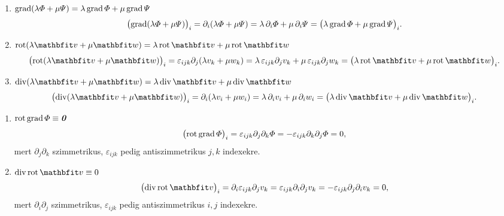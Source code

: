 \begin{example}
  \begin{enumerate}
    \item \underline{
            $\operatorname{grad}(\lambda\varPhi+\mu\varPsi)=\lambda\operatorname{grad}\varPhi+\mu\operatorname{grad}\varPsi$
          }
          $$
            \bigl(\operatorname{grad}(\lambda\varPhi+\mu\varPsi)\bigr)_i
            = \partial_i(\lambda\varPhi+\mu\varPsi)
            = \lambda\,\partial_i\varPhi+\mu\,\partial_i\varPsi
            = \bigl(\lambda\operatorname{grad}\varPhi+\mu\operatorname{grad}\varPsi\bigr)_i
            \text.
          $$

    \item \underline{
            $\rot(\lambda\rvec v+\mu\rvec w)=\lambda\rot\rvec v+\mu\rot\rvec w$
          }
          $$
            \bigl(\rot(\lambda\rvec v+\mu\rvec w)\bigr)_i
            = \varepsilon_{ijk}\partial_j(\lambda v_k+\mu w_k)
            = \lambda\,\varepsilon_{ijk}\partial_jv_k+\mu\,\varepsilon_{ijk}\partial_jw_k
            = \bigl(\lambda\rot\rvec v+\mu\rot\rvec w\bigr)_i
            \text.
          $$

    \item \underline{
            $\Div(\lambda\rvec v+\mu\rvec w)=\lambda\Div\rvec v+\mu\Div\rvec w$
          }
          $$
            \bigl(\Div(\lambda\rvec v+\mu\rvec w)\bigr)_i
            = \partial_i(\lambda v_i+\mu w_i)
            = \lambda\,\partial_iv_i+\mu\,\partial_iw_i
            = \bigl(\lambda\Div\rvec v+\mu\Div\rvec w\bigr)_i
            \text.
          $$
  \end{enumerate}
\end{example}

\begin{example}
  \begin{enumerate}
    \item \underline{$\operatorname{rot}\operatorname{grad}\varPhi\equiv\text{\textbf{\textit{0}}}$}
          $$
            \bigl(\operatorname{rot}\operatorname{grad}\varPhi\bigr)_i=\varepsilon_{ijk}\partial_j\partial_k\varPhi
            = -\varepsilon_{ijk}\partial_k\partial_j\varPhi=0,
          $$
          mert $\partial_j\partial_k$ szimmetrikus, $\varepsilon_{ijk}$ pedig
          antiszimmetrikus $j,k$ indexekre.

    \item \underline{$\Div\rot\rvec v\equiv0$}
          $$
            \bigl(\Div\rot\rvec v\bigr)_i=\partial_i\varepsilon_{ijk}\partial_jv_k
            = \varepsilon_{ijk}\partial_i\partial_jv_k
            = -\varepsilon_{ijk}\partial_j\partial_iv_k=0,
          $$
          mert $\partial_i\partial_j$ szimmetrikus, $\varepsilon_{ijk}$ pedig
          antiszimmetrikus $i,j$ indexekre.
  \end{enumerate}
\end{example}

